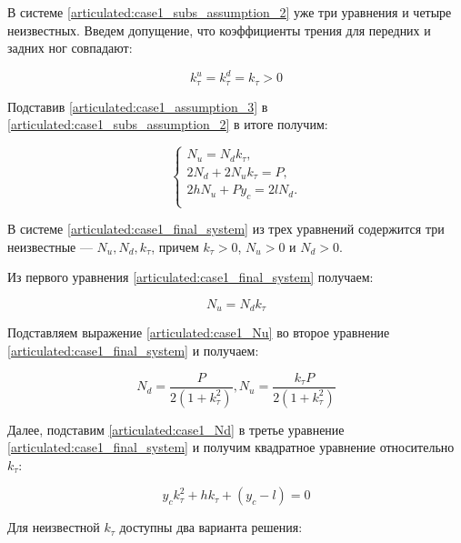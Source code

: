 В системе \ref{articulated:case1_subs_assumption_2} уже три уравнения и четыре неизвестных. Введем допущение, что коэффициенты трения для передних и задних ног совпадают: 

\begin{equation}
  \label{articulated:case1_assumption_3}
  k_\tau^u = k_\tau^d = k_\tau > 0
\end{equation}


Подставив \ref{articulated:case1_assumption_3} в \ref{articulated:case1_subs_assumption_2} в итоге получим:

\begin{equation}
  \label{articulated:case1_final_system}
  \left\{
  \begin{alignedat}{2}
    N_u = N_dk_\tau,\\
    2N_d + 2N_uk_\tau = P,\\
    2hN_u + Py_c = 2lN_d.\\
      \end{alignedat}
  \right.
\end{equation}

В системе \ref{articulated:case1_final_system} из трех уравнений содержится три неизвестные --- $N_u, N_d, k_\tau$, причем $k_\tau > 0$, $N_u > 0$ и $N_d > 0$.

Из первого уравнения \ref{articulated:case1_final_system} получаем:

\begin{equation}
\label{articulated:case1_Nu}
  N_u = N_dk_\tau
\end{equation}

Подставляем выражение \ref{articulated:case1_Nu} во второе уравнение \ref{articulated:case1_final_system} и получаем:

\begin{equation}
  \label{articulated:case1_Nd}
  N_d = \dfrac{P}{2(1+k_\tau^2)}, N_u = \dfrac{k_\tau P}{2(1+k_\tau^2)}
\end{equation}


Далее, подставим \ref{articulated:case1_Nd} в третье уравнение \ref{articulated:case1_final_system} и получим квадратное уравнение относительно $k_\tau$:

\begin{equation}
\label{articulated:case1_k}
y_ck_\tau^2+hk_\tau + (y_c-l) = 0
\end{equation}

Для неизвестной $k_\tau$ доступны два варианта решения:

